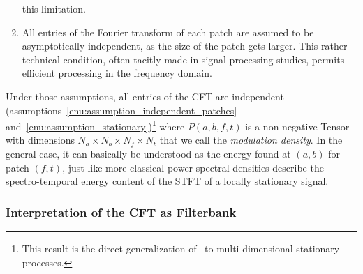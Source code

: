 \begin{enumerate}[leftmargin=0cm,itemindent=.5cm,labelwidth=\itemindent,labelsep=0cm,align=left]
this limitation.\label{enu:assumption_stationary}
\item All entries of the Fourier transform of each patch
are assumed to be asymptotically independent, as the size of the patch
gets larger. This rather technical condition, often tacitly made in
signal processing studies, permits efficient processing in the frequency
domain.\label{enu:assumption_harmonisable}
\end{enumerate}

Under those assumptions, all entries of the CFT are independent
(assumptions~\ref{enu:assumption_independent_patches} and~\ref{enu:assumption_stationary})\footnote{This result is the direct generalization
of~\cite[th. 6.5.1]{samoradnitsky94} to multi-dimensional stationary processes.}
where $P\left(a,b,f,t\right)$ is a non-negative Tensor with dimensions $N_{a}\times N_{b}\times N_{f}\times N_{t}$
 that we call the \emph{modulation density}. In
the general case, it can basically be understood as the energy found at $\left(a,b\right)$ for patch
$\left(f,t\right)$, just like more classical power spectral
densities describe the spectro-temporal energy content of the STFT
of a locally stationary signal.

\subsubsection{Interpretation of the CFT as Filterbank}
\label{sub:interpretation}

